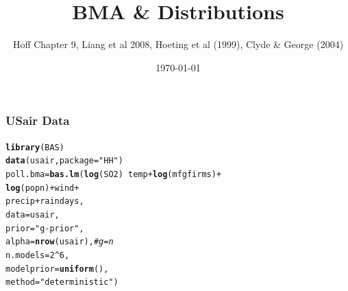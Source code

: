 \documentclass[]{beamer}\usepackage[]{graphicx}\usepackage[]{color}
\title{BMA \&  Distributions }
\author{Hoff Chapter 9, Liang et al 2008, Hoeting et al (1999), Clyde \&
 George (2004)}
\date{\today}
\makeatletter
\newcommand{\hlnum}[1]{\textcolor[rgb]{0.686,0.059,0.569}{#1}}%
\newcommand{\hlstr}[1]{\textcolor[rgb]{0.192,0.494,0.8}{#1}}%
\newcommand{\hlcom}[1]{\textcolor[rgb]{0.678,0.584,0.686}{\textit{#1}}}%
\newcommand{\hlopt}[1]{\textcolor[rgb]{0,0,0}{#1}}%
\newcommand{\hlstd}[1]{\textcolor[rgb]{0.345,0.345,0.345}{#1}}%
\newcommand{\hlkwb}[1]{\textcolor[rgb]{0.69,0.353,0.396}{#1}}%
\newcommand{\hlkwc}[1]{\textcolor[rgb]{0.333,0.667,0.333}{#1}}%
\newcommand{\hlkwd}[1]{\textcolor[rgb]{0.737,0.353,0.396}{\textbf{#1}}}%
\newenvironment{kframe}{%
 \def\at@end@of@kframe{}%
 \ifinner\ifhmode%
  \def\at@end@of@kframe{\end{minipage}}%
  \begin{minipage}{\columnwidth}%
 \fi\fi%
 \def\FrameCommand##1{\hskip\@totalleftmargin \hskip-\fboxsep
 \colorbox{shadecolor}{##1}\hskip-\fboxsep
     \hskip-\linewidth \hskip-\@totalleftmargin \hskip\columnwidth}%
 \MakeFramed {\advance\hsize-\width
   \@totalleftmargin\z@ \linewidth\hsize
   \@setminipage}}%
 {\par\unskip\endMakeFramed%
 \at@end@of@kframe}
\newenvironment{knitrout}{}{} %
\makeatother
\begin{document}
\maketitle




\begin{frame}[fragile]
\frametitle{USair Data}
\begin{knitrout}
\color{fgcolor}\begin{kframe}
\begin{alltt}
\hlkwd{library}\hlstd{(BAS)}
\hlkwd{data}\hlstd{(usair,} \hlkwc{package}\hlstd{=}\hlstr{"HH"}\hlstd{)}
\hlstd{poll.bma} \hlkwb{=} \hlkwd{bas.lm}\hlstd{(}\hlkwd{log}\hlstd{(SO2)} \hlopt{~} \hlstd{temp} \hlopt{+} \hlkwd{log}\hlstd{(mfgfirms)} \hlopt{+}
                             \hlkwd{log}\hlstd{(popn)} \hlopt{+} \hlstd{wind} \hlopt{+}
                             \hlstd{precip} \hlopt{+} \hlstd{raindays,}
                  \hlkwc{data}\hlstd{=usair,}
                  \hlkwc{prior}\hlstd{=}\hlstr{"g-prior"}\hlstd{,}
                  \hlkwc{alpha}\hlstd{=}\hlkwd{nrow}\hlstd{(usair),} \hlcom{# g = n}
                  \hlkwc{n.models}\hlstd{=}\hlnum{2}\hlopt{^}\hlnum{6}\hlstd{,}
                  \hlkwc{modelprior} \hlstd{=} \hlkwd{uniform}\hlstd{(),}
                  \hlkwc{method}\hlstd{=}\hlstr{"deterministic"}\hlstd{)}
\end{alltt}
\end{kframe}
\end{knitrout}


\end{frame}
\end{document}
